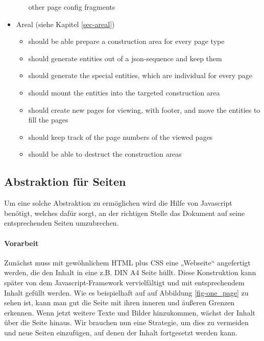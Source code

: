 \begin{itemize}
\begin{itemize}
            other page config fragments
    \end{itemize}
  \item Areal (siehe Kapitel \ref{sec-areal})
    \begin{itemize}
      \item should be able prepare a construction area for every page type
      \item should generate entities out of a json-sequence and keep them
      \item should generate the special entities, which are individual
            for every page
      \item should mount the entities into the targeted construction area
      \item should create new pages for viewing, with footer, and move the
            entities to fill the pages
      \item should keep track of the page numbers of the viewed pages
      \item should be able to destruct the construction areas
    \end{itemize}
\end{itemize}

\subsection{Abstraktion für Seiten}\label{sec-abstrationSeiten}

Um eine solche Abstraktion zu ermöglichen wird die Hilfe von Javascript
benötigt, welches dafür sorgt, an der richtigen Stelle das Dokument auf
seine entsprechenden Seiten umzubrechen.

\paragraph{Vorarbeit}
Zunächst muss mit gewöhnlichem HTML plus CSS eine „Webseite“ angefertigt
werden, die den Inhalt in eine z.B. DIN A4 Seite hüllt. Diese Konstruktion
kann später von dem Javascript-Framework vervielfältigt und mit entsprechendem
Inhalt gefüllt werden. Wie es beispielhaft auf auf Abbildung
\ref{fig-one_page} zu sehen ist,
kann man gut die Seite mit ihren inneren und äußeren
Grenzen erkennen. Wenn jetzt weitere Texte und Bilder
hinzukommen, wächst der Inhalt über die Seite hinaus. Wir brauchen nun
eine Strategie, um dies zu vermeiden und neue Seiten einzufügen, auf denen
der Inhalt fortgesetzt werden kann.

